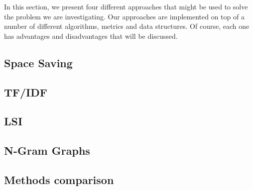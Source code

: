 In this section, we present four different approaches that might be used to solve the problem we are investigating. 
Our approaches are implemented on top of a number of different algorithms, metrics and data structures.
Of course, each one has advantages and disadvantages that will be discussed.


\subsection{Space Saving}


\subsection{TF/IDF}


\subsection{LSI}


\subsection{N-Gram Graphs}


\subsection*{Methods comparison}

